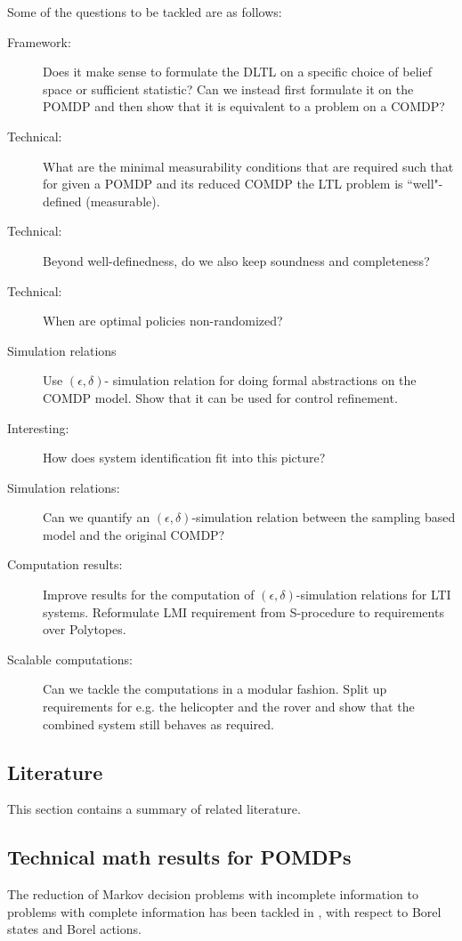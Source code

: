 \documentclass[conference]{IEEEtran}
\begin{document}
Some of the questions to be tackled are as follows:
\begin{description}
	\item[Framework:] Does it make sense to formulate the DLTL on a specific choice of belief space or sufficient statistic? Can we instead first formulate it on the POMDP and then show that it  is equivalent to a problem on a COMDP?
	\item[Technical:]  What are the minimal measurability conditions that are required such that for given a POMDP and its reduced COMDP  the LTL problem is ``well"-defined (measurable).
	\item[Technical:] Beyond well-definedness, do we also keep soundness and completeness?
	\item[Technical:] When are optimal policies non-randomized?
	\item[Simulation relations]  Use $(\epsilon,\delta)$- simulation relation for doing formal abstractions on the COMDP model.
	Show that it can be used for control refinement.
	\item[Interesting:] How does system identification fit into this picture?
	\item[Simulation relations:] Can we quantify an $(\epsilon,\delta)$-simulation relation between the sampling based model and the original COMDP?
	\item[Computation results:] Improve results for the computation of $(\epsilon,\delta)$-simulation relations for LTI systems. Reformulate LMI requirement from S-procedure to requirements over Polytopes. 
	\item[Scalable computations:] Can we  tackle the computations in a modular fashion. Split up requirements for e.g. the helicopter and the rover and show that the combined system still behaves as required.
	 
\end{description}


\subsection{Literature}
This section contains a summary of related literature.

\subsection{Technical math results for POMDPs}
The reduction of Markov decision problems with incomplete information to problems with complete information has been tackled in
\cite{yushkevich_reduction_1976,rhenius_incomplete_1974}, with respect to Borel states and Borel actions.
\end{document}
